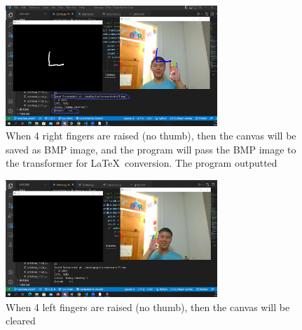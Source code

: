 \begin{figure}[h!]
    \centering
    \includegraphics[width=8cm]{images/feed.png}
    \caption{When 4 right fingers are raised (no thumb), then the canvas will be saved as BMP image, and the program will pass the BMP image to the transformer for \LaTeX\ conversion. The program outputted }
    \label{fig:mpfeed}
\end{figure}

\begin{figure}[h!]
    \centering
    \includegraphics[width=8cm]{images/clear.png}
    \caption{When 4 left fingers are raised (no thumb), then the canvas will be cleared}
    \label{fig:mpclear}
\end{figure}
